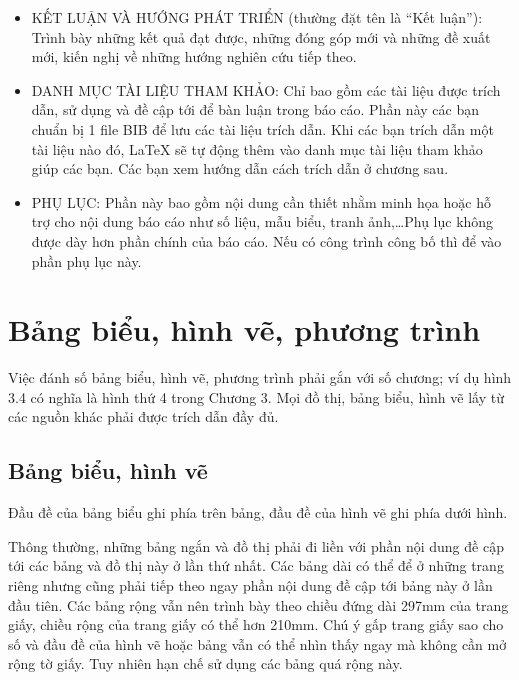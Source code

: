 \begin{itemize}
\item KẾT LUẬN VÀ HƯỚNG PHÁT TRIỂN (thường đặt tên là ``Kết luận''): Trình bày những kết quả đạt được, những đóng góp mới và những đề xuất mới, kiến nghị về những hướng nghiên cứu tiếp theo.

\item DANH MỤC TÀI LIỆU THAM KHẢO: Chỉ bao gồm các tài liệu được trích dẫn, sử dụng và đề cập tới để bàn luận trong báo cáo.
Phần này các bạn chuẩn bị 1 file BIB để lưu các tài liệu trích dẫn.
Khi các bạn trích dẫn một tài liệu nào đó, LaTeX sẽ tự động thêm vào danh mục tài liệu tham khảo giúp các bạn.
Các bạn xem hướng dẫn cách trích dẫn ở chương sau.

\item PHỤ LỤC: Phần này bao gồm nội dung cần thiết nhằm minh họa hoặc hỗ trợ cho nội dung báo cáo như số liệu, mẫu biểu, tranh ảnh,\ldots Phụ lục không được dày hơn phần chính của báo cáo.
Nếu có công trình công bố thì để vào phần phụ lục này.
\end{itemize}

\section{Bảng biểu, hình vẽ, phương trình}


Việc đánh số bảng biểu, hình vẽ, phương trình phải gắn với số chương; ví dụ hình 3.4 có nghĩa là hình thứ 4 trong Chương 3.
Mọi đồ thị, bảng biểu, hình vẽ lấy từ các nguồn khác phải được trích dẫn đầy đủ.

\subsection{Bảng biểu, hình vẽ}



Đầu đề của bảng biểu ghi phía trên bảng, đầu đề của hình vẽ ghi phía dưới hình.

Thông thường, những bảng ngắn và đồ thị phải đi liền với phần nội dung đề cập tới các bảng và đồ thị này ở lần thứ nhất.
Các bảng dài có thể để ở những trang riêng nhưng cũng phải tiếp theo ngay phần nội dung đề cập tới bảng này ở lần đầu tiên.
Các bảng rộng vẫn nên trình bày theo chiều đứng dài 297mm của trang giấy, chiều rộng của trang giấy có thể hơn 210mm.
Chú ý gấp trang giấy sao cho số và đầu đề của hình vẽ hoặc bảng vẫn có thể nhìn thấy ngay mà không cần mở rộng tờ giấy.
Tuy nhiên hạn chế sử dụng các bảng quá rộng này.

